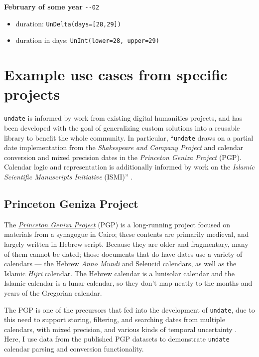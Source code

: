 \documentclass[final]{anthology-ch} %
\begin{document}
\noindent
\textbf{February of some year} \texttt{{-}{-02}}
\begin{itemize}
    \item duration: \texttt{UnDelta(days=[28,29])}
    \item duration in days: \texttt{UnInt(lower=28, upper=29)}
\end{itemize}
    
\section{Example use cases from specific projects}\label{example-use-cases-from-specific-projects}
\texttt{undate} is informed by work from existing digital humanities projects, and has been developed with the goal of generalizing custom solutions into a reusable library to benefit the whole community. In particular, ``\texttt{undate} draws on a partial date implementation from the \textit{Shakespeare and Company Project} and calendar conversion and mixed precision dates in the \textit{Princeton Geniza Project} (PGP). Calendar logic and representation is additionally informed by work on the \textit{Islamic Scientific Manuscripts Initiative} (ISMI)'' \cite{koeser_undate_2025}.

\subsection{Princeton Geniza Project}\label{princeton-geniza-project}

The \href{https://geniza.princeton.edu/}{\textit{Princeton Geniza Project}} (PGP) is a long-running project focused on materials from a synagogue in Cairo; these contents are primarily medieval, and largely written in Hebrew script. Because they are older and fragmentary, many of them cannot be dated;  those documents that do have dates use a variety of calendars — the Hebrew \textit{Anno Mundi} and Seleucid calendars, as well as the Islamic \textit{Hijri} calendar. The Hebrew calendar is a lunisolar calendar and the Islamic calendar is a lunar calendar, so they don't map neatly to the months and years of the Gregorian calendar.

The PGP is one of the precursors that fed into the development of \texttt{undate}, due to this need to support storing, filtering, and searching dates from multiple calendars, with mixed precision, and various kinds of temporal uncertainty \cite{rustow_dating_2020}. Here, I use data from the published PGP datasets \cite{rustow_princeton_2025} to demonstrate \texttt{undate} calendar parsing and conversion functionality. 
\end{document}
